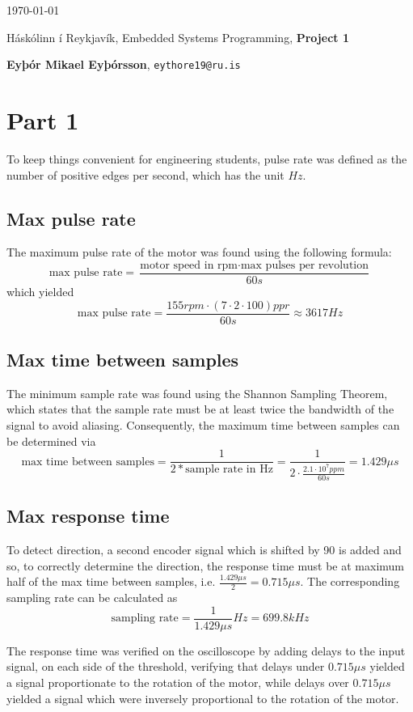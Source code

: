 \documentclass{article}
\begin{document}
\today \par
\vspace{.5cm}
\noindent Háskólinn í Reykjavík, Embedded Systems Programming, \textbf{Project 1} \par
\noindent \textbf{Eyþór Mikael Eyþórsson}, \texttt{eythore19@ru.is}\par

\section*{Part 1}
To keep things convenient for engineering students, pulse rate was defined as the number
of positive edges per second, which has the unit $Hz$.
\subsection*{Max pulse rate}
The maximum pulse rate of the motor was found using the following formula: \[
    \text{max pulse rate} = \frac{\text{motor speed in rpm} \cdot \text{max pulses per
    revolution}}{60s}
\] which yielded \[
\text{max pulse rate} = \frac{155rpm \cdot (7\cdot 2\cdot 100)ppr}{60s} \approx 3617Hz
\]

\subsection*{Max time between samples}
The minimum sample rate was found using the Shannon Sampling Theorem, which
states that the sample rate must be at least twice the bandwidth of the signal to avoid
aliasing. Consequently, the maximum time between samples can be determined via \[
    \text{max time between samples} = \frac{1}{2*\text{sample rate in Hz}} =
    \frac{1}{2\cdot\frac{2.1\cdot 10^7ppm}{60s}} = 1.429\mu s
\]

\subsection*{Max response time}
To detect direction, a second encoder signal which is shifted by 90\textdegree{} is added
and so, to correctly determine the direction, the response time must be at maximum half of
the max time between samples, i.e. $\frac{1.429\mu s}{2} = 0.715\mu s$. The corresponding
sampling rate can be calculated as \[
    \text{sampling rate} = \frac{1}{1.429\mu s}Hz = 699.8kHz
\]

The response time was verified on the oscilloscope by adding delays to the input signal,
on each side of the threshold, verifying that delays under $0.715\mu s$ yielded a signal
proportionate to the rotation of the motor, while delays over $0.715\mu s$ yielded a
signal which were inversely proportional to the rotation of the motor.



\end{document}
